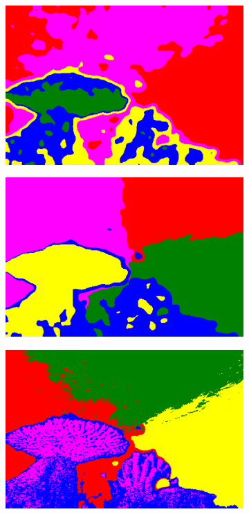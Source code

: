 \begin{figure}[h!]
\begin{subfigure}[t]{0.32\textwidth}
		\centering
		\includegraphics[width=\textwidth,keepaspectratio]{images/gen/GEN_tsugf_filterbank_101027_blur.png}
	\end{subfigure}
	\hfill
	\begin{subfigure}[t]{0.32\textwidth}
		\centering
		\includegraphics[width=\textwidth,keepaspectratio]{images/gen/GEN_tsugf_filterbank_101027_blur_norm_spatial.png}
	\end{subfigure}
	\hfill
	\begin{subfigure}[t]{0.32\textwidth}
		\centering
		\includegraphics[width=\textwidth,keepaspectratio]{images/gen/GEN_tsugf_filterbank_101027_blur_norm_spatial_color.png}

\end{subfigure}
\end{figure}
